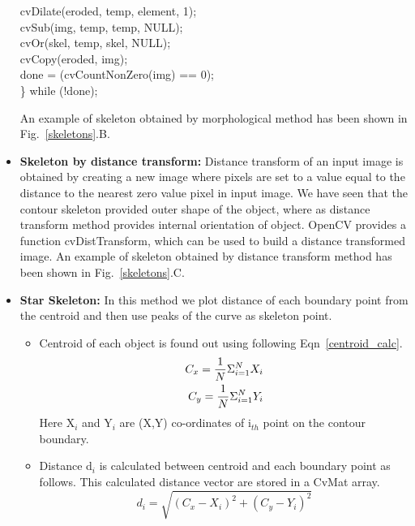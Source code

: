 \begin{itemize}
{{	\hspace*{1 in}cvDilate(eroded, temp, element, 1);\\
	\hspace*{1 in}cvSub(img, temp, temp, NULL);\\
	\hspace*{1 in}cvOr(skel, temp, skel, NULL);\\
	\hspace*{1 in}cvCopy(eroded, img);\\
	\hspace*{1 in}done = (cvCountNonZero(img) == 0);\\
	\} while (!done);
}} \par
\indent An example of skeleton obtained by morphological method has been
shown in Fig.~\ref{skeletons}.B.
\item \textbf{Skeleton by distance transform:} Distance transform of an
	input image is obtained by creating a new image where pixels are
	set to a value equal to the distance to the nearest zero value
	pixel in input image. We have seen that the contour skeleton
	provided outer shape of the object, where as distance transform
	method provides internal orientation of object. OpenCV provides
	a function cvDistTransform, which can be used to build a
	distance transformed image. An example of skeleton obtained by
	distance transform method has been shown in
	Fig.~\ref{skeletons}.C.
\item \textbf{Star Skeleton:} In this method we plot distance of each
	boundary point from the centroid and then use peaks of the curve
	as skeleton point.
\begin{itemize}
\item Centroid of each object is found out using following
	Eqn~\ref{centroid_calc}.
	\begin{eqnarray}
	C_x = {1 \over N} \Sigma ^N _{i = 1} X_i \label{centroid_calc}
\nonumber \\
	C_y = {1 \over N} \Sigma ^N _{i = 1} Y_i 
	\end{eqnarray}
Here X$_i$ and Y$_i$ are (X,Y) co-ordinates of i$_{th}$ point on the contour
boundary.
\item Distance d$_i$ is calculated between centroid and each boundary
	point as follows. This calculated distance vector are stored in a
	CvMat array.
	\begin{equation}
	d_i = \sqrt{(C_x - X_i)^2 + (C_y - Y_i)^2} \label{dist_calc}
	\end{equation}


\end{itemize}
\end{itemize}
